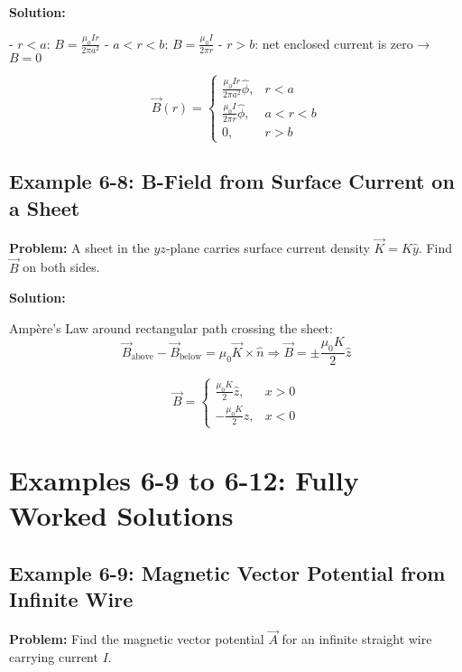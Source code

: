\documentclass[12pt]{article}
\begin{document}
\textbf{Solution:}

- \( r < a \): \( B = \frac{\mu_0 I r}{2\pi a^2} \)
- \( a < r < b \): \( B = \frac{\mu_0 I}{2\pi r} \)
- \( r > b \): net enclosed current is zero → \( B = 0 \)

\begin{tcolorbox}
\[
\boxed{
\vec{B}(r) =
\begin{cases}
\frac{\mu_0 I r}{2\pi a^2} \hat{\phi}, & r < a \\
\frac{\mu_0 I}{2\pi r} \hat{\phi}, & a < r < b \\
0, & r > b
\end{cases}
}
\]
\end{tcolorbox}

\subsection*{Example 6-8: B-Field from Surface Current on a Sheet}

\textbf{Problem:}  
A sheet in the \( yz \)-plane carries surface current density \( \vec{K} = K \hat{y} \). Find \( \vec{B} \) on both sides.

\textbf{Solution:}

Ampère’s Law around rectangular path crossing the sheet:
\[
\vec{B}_{\text{above}} - \vec{B}_{\text{below}} = \mu_0 \vec{K} \times \hat{n}
\Rightarrow \vec{B} = \pm \frac{\mu_0 K}{2} \hat{z}
\]

\begin{tcolorbox}
\[
\boxed{
\vec{B} =
\begin{cases}
\frac{\mu_0 K}{2} \hat{z}, & x > 0 \\
-\frac{\mu_0 K}{2} \hat{z}, & x < 0
\end{cases}
}
\]
\end{tcolorbox}



\section*{Examples 6-9 to 6-12: Fully Worked Solutions}

\subsection*{Example 6-9: Magnetic Vector Potential from Infinite Wire}

\textbf{Problem:}  
Find the magnetic vector potential \( \vec{A} \) for an infinite straight wire carrying current \( I \).
\end{document}
